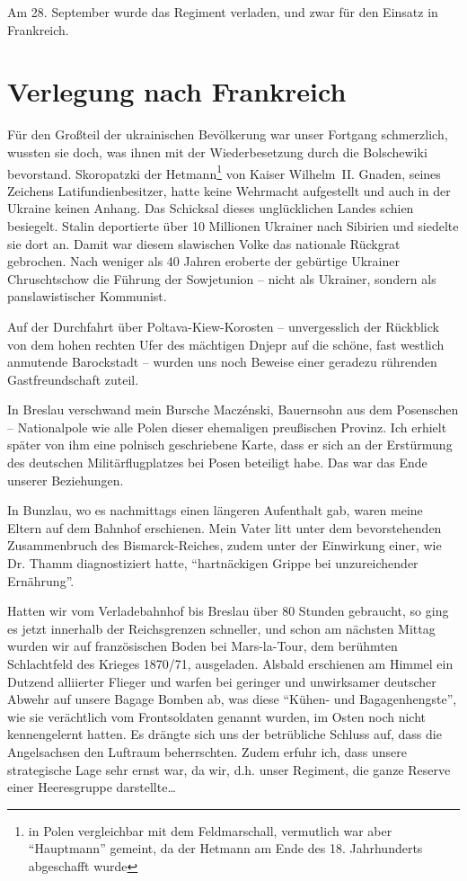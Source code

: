 Am 28. September wurde das Regiment verladen, und zwar für den Einsatz in Frankreich.

\section{Verlegung nach Frankreich}
Für den Großteil der ukrainischen Bevölkerung war unser Fortgang schmerzlich, wussten sie doch, was ihnen mit der Wiederbesetzung durch die Bolschewiki bevorstand. Skoropatzki der Hetmann\footnote{in Polen vergleichbar mit dem Feldmarschall, vermutlich war aber \enquote{Hauptmann} gemeint, da der Hetmann am Ende des 18. Jahrhunderts abgeschafft wurde} von Kaiser Wilhelm~II. Gnaden, seines Zeichens Latifundienbesitzer, hatte keine Wehrmacht aufgestellt und auch in der Ukraine keinen Anhang. Das Schicksal dieses unglücklichen Landes schien besiegelt. Stalin deportierte über 10 Millionen Ukrainer nach Sibirien und siedelte sie dort an. Damit war diesem slawischen Volke das nationale Rückgrat gebrochen. Nach weniger als 40 Jahren eroberte der gebürtige Ukrainer Chruschtschow die Führung der Sowjetunion -- nicht als Ukrainer, sondern als panslawistischer Kommunist.

Auf der Durchfahrt über Poltava-Kiew-Korosten -- unvergesslich der Rückblick von dem hohen rechten Ufer des mächtigen Dnjepr auf die schöne, fast westlich anmutende Barockstadt -- wurden uns noch Beweise einer geradezu rührenden Gastfreundschaft zuteil.

In Breslau verschwand mein Bursche Maczénski, Bauernsohn aus dem Posenschen -- Nationalpole wie alle Polen dieser ehemaligen preußischen Provinz. Ich erhielt später von ihm eine polnisch geschriebene Karte, dass er sich an der Erstürmung des deutschen Militärflugplatzes bei Posen beteiligt habe. Das war das Ende unserer Beziehungen.

In Bunzlau, wo es nachmittags einen längeren Aufenthalt gab, waren meine Eltern auf dem Bahnhof erschienen. Mein Vater litt unter dem bevorstehenden Zusammenbruch des Bismarck-Reiches, zudem unter der Einwirkung einer, wie Dr. Thamm diagnostiziert hatte, \enquote{hartnäckigen Grippe bei unzureichender Ernährung}.

Hatten wir vom Verladebahnhof bis Breslau über 80 Stunden gebraucht, so ging es jetzt innerhalb der Reichsgrenzen schneller, und schon am nächsten Mittag wurden wir auf französischen Boden bei Mars-la-Tour, dem berühmten Schlachtfeld des Krieges 1870/71, ausgeladen. Alsbald erschienen am Himmel ein Dutzend alliierter Flieger und warfen bei geringer und unwirksamer deutscher Abwehr auf unsere Bagage Bomben ab, was diese \enquote{Kühen- und Bagagenhengste}, wie sie verächtlich vom Frontsoldaten genannt wurden, im Osten noch nicht kennengelernt hatten. Es drängte sich uns der betrübliche Schluss auf, dass die Angelsachsen den Luftraum beherrschten. Zudem erfuhr ich, dass unsere strategische Lage sehr ernst war, da wir, d.h. unser Regiment, die ganze Reserve einer Heeresgruppe darstellte\dots

